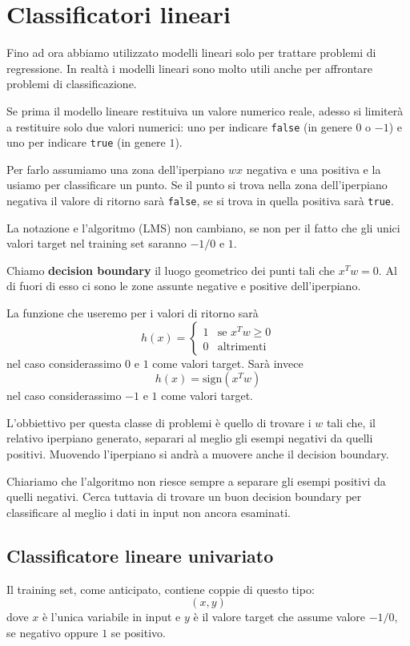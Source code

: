 \chapter{Classificatori lineari}
Fino ad ora abbiamo utilizzato modelli lineari solo per trattare problemi di regressione. In realt\`a i modelli lineari
sono molto utili anche per affrontare problemi di classificazione.

Se prima il modello lineare restituiva un valore numerico reale, adesso si limiter\`a a restituire solo due valori
numerici: uno per indicare \verb|false| (in genere $0$ o $-1$) e uno per indicare \verb|true| (in genere $1$).

Per farlo assumiamo una zona dell'iperpiano $wx$ negativa e una positiva e la usiamo per classificare un punto. Se il
punto si trova nella zona dell'iperpiano negativa il valore di ritorno sar\`a \verb|false|, se si trova in quella
positiva sar\`a \verb|true|.

La notazione e l'algoritmo (LMS) non cambiano, se non per il fatto che gli unici valori target nel training set saranno
$-1/0$ e $1$.

\begin{definition}
	Chiamo \textbf{decision boundary} il luogo geometrico dei punti tali che $x^T w = 0$. Al di fuori di esso ci sono
	le zone assunte negative e positive dell'iperpiano.
\end{definition}

La funzione che useremo per i valori di ritorno sar\`a
\[
	h(x) = \begin{cases}
		1 & \text{se } x^T w \geq 0 \\
		0 & \text{altrimenti}
	\end{cases}
\]
nel caso considerassimo $0$ e $1$ come valori target. Sar\`a invece
\[ h(x) = \text{sign}(x^T w) \]
nel caso considerassimo $-1$ e $1$ come valori target.

L'obbiettivo per questa classe di problemi \`e quello di trovare i $w$ tali che, il relativo iperpiano generato,
separari al meglio gli esempi negativi da quelli positivi. Muovendo l'iperpiano si andr\`a a muovere anche il
decision boundary.

Chiariamo che l'algoritmo non riesce sempre a separare gli esempi positivi da quelli negativi. Cerca tuttavia di
trovare un buon decision boundary per classificare al meglio i dati in input non ancora esaminati.

\section{Classificatore lineare univariato}
Il training set, come anticipato, contiene coppie di questo tipo:
\[ (x, y) \]
dove $x$ \`e l'unica variabile in input e $y$ \`e il valore target che assume valore $-1/0$, se negativo oppure $1$ se
positivo.

